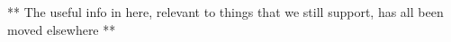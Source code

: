 ** The useful info in here, relevant to things that we still support, has all been moved elsewhere **
%
%
%
%
